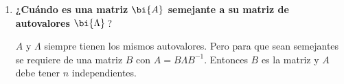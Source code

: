 \begin{enumerate}
\item \textbf{¿Cuándo es una matriz $\bi{A}$ semejante a su matriz de autovalores $\bi{\Lambda}$}\,?

$A$ y $\Lambda$ siempre tienen los mismos autovalores. Pero para que sean semejantes se requiere de una matriz $B$ con $A=B\Lambda B^{-1}$. Entonces $B$ es la matriz \1 y $A$ debe tener $n$ \1 independientes.

\end{enumerate}